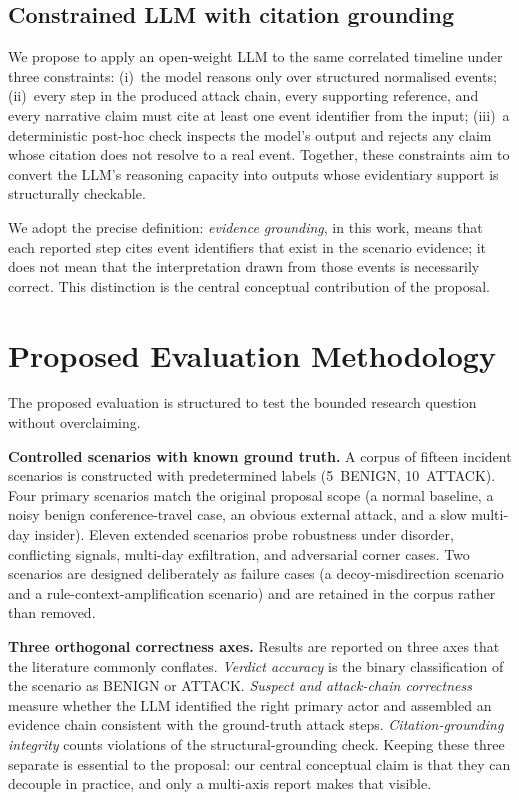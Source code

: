 \documentclass[conference]{IEEEtran}
\begin{document}
\subsection{Constrained LLM with citation grounding}
We propose to apply an open-weight LLM to the same correlated timeline under three constraints: (i)~the model reasons only over structured normalised events; (ii)~every step in the produced attack chain, every supporting reference, and every narrative claim must cite at least one event identifier from the input; (iii)~a deterministic post-hoc check inspects the model's output and rejects any claim whose citation does not resolve to a real event. Together, these constraints aim to convert the LLM's reasoning capacity into outputs whose evidentiary support is structurally checkable.

We adopt the precise definition: \textit{evidence grounding}, in this work, means that each reported step cites event identifiers that exist in the scenario evidence; it does not mean that the interpretation drawn from those events is necessarily correct. This distinction is the central conceptual contribution of the proposal.

\section{Proposed Evaluation Methodology}
\label{sec:method}

The proposed evaluation is structured to test the bounded research question without overclaiming.

\textbf{Controlled scenarios with known ground truth.} A corpus of fifteen incident scenarios is constructed with predetermined labels (5~BENIGN, 10~ATTACK). Four primary scenarios match the original proposal scope (a normal baseline, a noisy benign conference-travel case, an obvious external attack, and a slow multi-day insider). Eleven extended scenarios probe robustness under disorder, conflicting signals, multi-day exfiltration, and adversarial corner cases. Two scenarios are designed deliberately as failure cases (a decoy-misdirection scenario and a rule-context-amplification scenario) and are retained in the corpus rather than removed.

\textbf{Three orthogonal correctness axes.} Results are reported on three axes that the literature commonly conflates. \textit{Verdict accuracy} is the binary classification of the scenario as BENIGN or ATTACK. \textit{Suspect and attack-chain correctness} measure whether the LLM identified the right primary actor and assembled an evidence chain consistent with the ground-truth attack steps. \textit{Citation-grounding integrity} counts violations of the structural-grounding check. Keeping these three separate is essential to the proposal: our central conceptual claim is that they can decouple in practice, and only a multi-axis report makes that visible.
\end{document}
